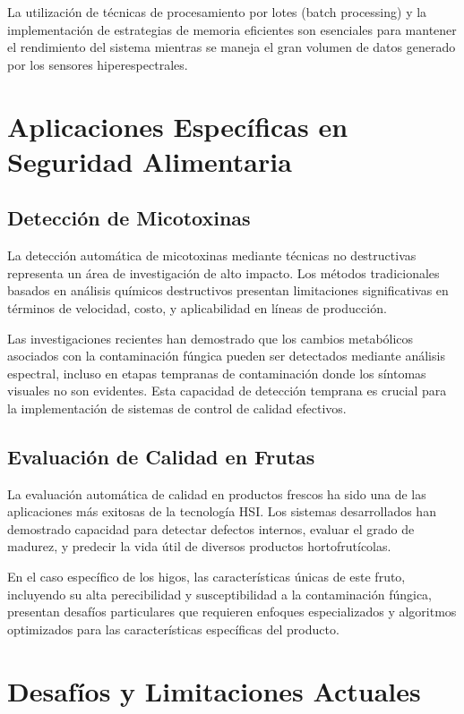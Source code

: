 La utilización de técnicas de procesamiento por lotes (batch processing) y la implementación de estrategias de memoria eficientes son esenciales para mantener el rendimiento del sistema mientras se maneja el gran volumen de datos generado por los sensores hiperespectrales.

\section{Aplicaciones Específicas en Seguridad Alimentaria}

\subsection{Detección de Micotoxinas}
La detección automática de micotoxinas mediante técnicas no destructivas representa un área de investigación de alto impacto. Los métodos tradicionales basados en análisis químicos destructivos presentan limitaciones significativas en términos de velocidad, costo, y aplicabilidad en líneas de producción.

Las investigaciones recientes han demostrado que los cambios metabólicos asociados con la contaminación fúngica pueden ser detectados mediante análisis espectral, incluso en etapas tempranas de contaminación donde los síntomas visuales no son evidentes. Esta capacidad de detección temprana es crucial para la implementación de sistemas de control de calidad efectivos.

\subsection{Evaluación de Calidad en Frutas}
La evaluación automática de calidad en productos frescos ha sido una de las aplicaciones más exitosas de la tecnología HSI. Los sistemas desarrollados han demostrado capacidad para detectar defectos internos, evaluar el grado de madurez, y predecir la vida útil de diversos productos hortofrutícolas.

En el caso específico de los higos, las características únicas de este fruto, incluyendo su alta perecibilidad y susceptibilidad a la contaminación fúngica, presentan desafíos particulares que requieren enfoques especializados y algoritmos optimizados para las características específicas del producto.

\section{Desafíos y Limitaciones Actuales}

